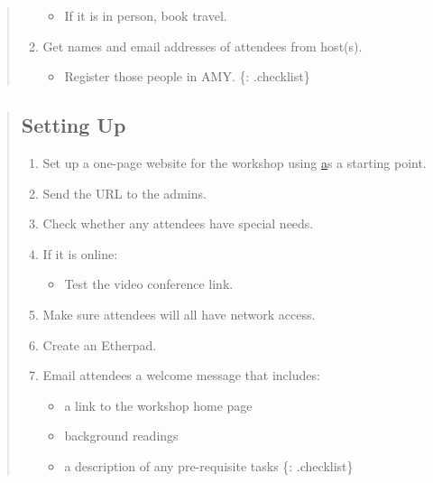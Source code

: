 \begin{quote}
\begin{enumerate}
  \begin{itemize}
  \itemsep1pt\parskip0pt
  \item
    If it is in person, book travel.
  \end{itemize}
\item
  Get names and email addresses of attendees from host(s).

  \begin{itemize}
  \itemsep1pt\parskip0pt
  \item
    Register those people in AMY. \{: .checklist\}
  \end{itemize}
\end{enumerate}
\end{quote}

\begin{quote}
\subsection{Setting Up}\label{setting-up}

\begin{enumerate}
\def\labelenumi{\arabic{enumi}.}
\itemsep1pt\parskip0pt
\item
  Set up a one-page website for the workshop using
  \href{https://github.com/swcarpentry/training-template} as a starting
  point.
\item
  Send the URL to the admins.
\item
  Check whether any attendees have special needs.
\item
  If it is online:

  \begin{itemize}
  \itemsep1pt\parskip0pt
  \item
    Test the video conference link.
  \end{itemize}
\item
  Make sure attendees will all have network access.
\item
  Create an Etherpad.
\item
  Email attendees a welcome message that includes:

  \begin{itemize}
  \itemsep1pt\parskip0pt
  \item
    a link to the workshop home page
  \item
    background readings
  \item
    a description of any pre-requisite tasks \{: .checklist\}
  \end{itemize}
\end{enumerate}
\end{quote}

